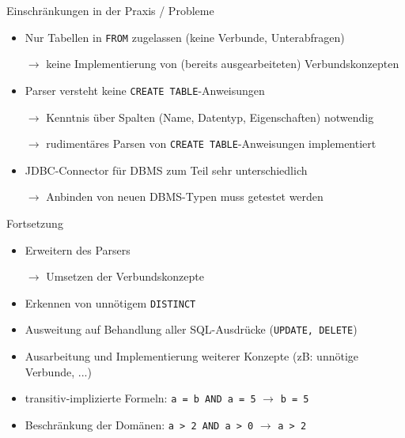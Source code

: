 \documentclass{beamer}
\begin{document}
\begin{frame}[fragile]{Einschränkungen in der Praxis / Probleme}
\begin{itemize}
\item Nur Tabellen in \verb|FROM| zugelassen (keine Verbunde, Unterabfragen)
\item[$\to$] keine Implementierung von (bereits ausgearbeiteten) Verbundskonzepten
\item Parser versteht keine \verb|CREATE TABLE|-Anweisungen
\item[$\to$] Kenntnis über Spalten (Name, Datentyp, Eigenschaften) notwendig
\item[$\to$] rudimentäres Parsen von \verb|CREATE TABLE|-Anweisungen implementiert 
\item JDBC-Connector für DBMS zum Teil sehr unterschiedlich
\item[$\to$] Anbinden von neuen DBMS-Typen muss getestet werden
\end{itemize}

\end{frame}

\begin{frame}[fragile]{Fortsetzung}
\begin{itemize}
\item Erweitern des Parsers 
\item[$\to$] Umsetzen der Verbundskonzepte
\item Erkennen von unnötigem \verb|DISTINCT|
\item Ausweitung auf Behandlung aller SQL-Ausdrücke (\verb|UPDATE, DELETE|)
\item Ausarbeitung und Implementierung weiterer Konzepte (zB: unnötige Verbunde, ...)
\item transitiv-implizierte Formeln: \verb|a = b AND a = 5| $\to$ \verb|b = 5|
\item Beschränkung der Domänen: \verb|a > 2 AND a > 0| $\to$ \verb|a > 2|
\end{itemize}
\end{frame}

\end{document}
